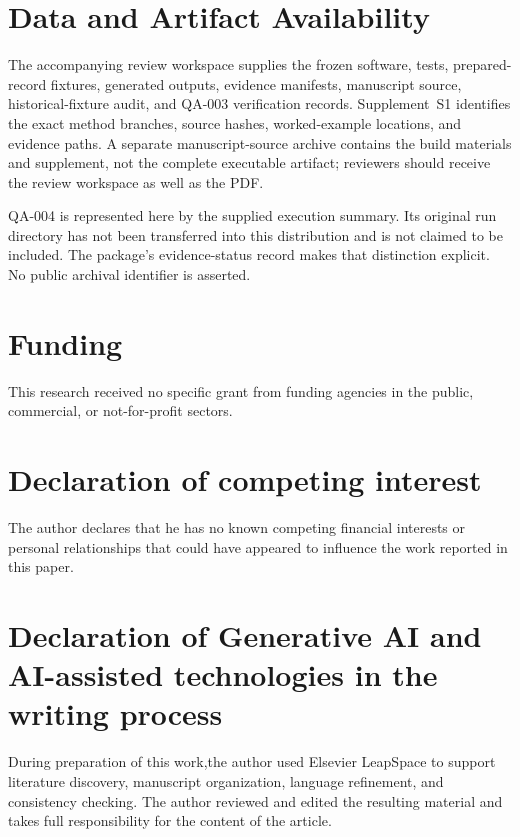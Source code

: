 \documentclass[a4paper,fleqn]{cas-dc}
\begin{document}

\section*{Data and Artifact Availability}

The accompanying review workspace supplies the frozen software, tests, prepared-record fixtures, generated outputs, evidence manifests, manuscript source, historical-fixture audit, and QA-003 verification records. Supplement~S1 identifies the exact method branches, source hashes, worked-example locations, and evidence paths. A separate manuscript-source archive contains the build materials and supplement, not the complete executable artifact; reviewers should receive the review workspace as well as the PDF.

QA-004 is represented here by the supplied execution summary. Its original run directory has not been transferred into this distribution and is not claimed to be included. The package's evidence-status record makes that distinction explicit. No public archival identifier is asserted.






\section*{Funding}
This research received no specific grant from funding agencies in the public, commercial, or not-for-profit sectors.

\section*{Declaration of competing interest}
The author declares that he has no known competing financial interests or personal relationships that could have appeared to influence the work reported in this paper.

\section*{Declaration of Generative AI and AI-assisted technologies in the writing process}
During preparation of this work,the author used Elsevier LeapSpace to support literature discovery, manuscript organization, language refinement, and consistency checking. The author reviewed and edited the resulting material and takes full responsibility for the content of the article.
\end{document}
